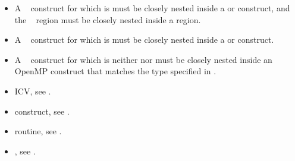\restrictions
\begin{itemize}
\item A ~ construct for which 
       is  must be closely nested
      inside a  or  construct, and the ~ region 
      must be closely nested inside a  region. 
\item A ~ construct for which 
       is  must be closely nested inside 
      a  or  construct.
\item A ~ construct for which 
       is neither  nor 
      must be closely nested inside an OpenMP construct that matches the type 
      specified in .
\end{itemize}

\begin{samepage}
\crossreferences
\begin{itemize}
\item {} ICV, see
.

\item {} construct, see
.

\item {} routine, see
.

\item {}, see .

\end{itemize}
\end{samepage}
